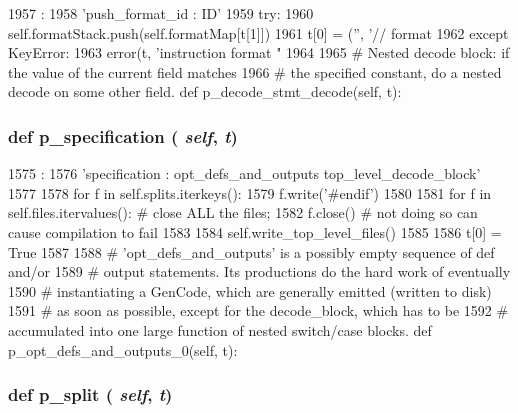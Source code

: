 \begin{DoxyCode}
1957                                  :
1958         'push_format_id : ID'
1959         try:
1960             self.formatStack.push(self.formatMap[t[1]])
1961             t[0] = ('', '// format %
1962         except KeyError:
1963             error(t, 'instruction format "%
1964 
1965     # Nested decode block: if the value of the current field matches
1966     # the specified constant, do a nested decode on some other field.
    def p_decode_stmt_decode(self, t):
\end{DoxyCode}
\hypertarget{classisa__parser_1_1ISAParser_ab00ad4dda9edefa214154bff3d217fc3}{
\subsubsection[{p\_\-specification}]{\setlength{\rightskip}{0pt plus 5cm}def p\_\-specification ( {\em self}, \/   {\em t})}}
\label{classisa__parser_1_1ISAParser_ab00ad4dda9edefa214154bff3d217fc3}



\begin{DoxyCode}
1575                                 :
1576         'specification : opt_defs_and_outputs top_level_decode_block'
1577 
1578         for f in self.splits.iterkeys():
1579             f.write('\n#endif\n')
1580 
1581         for f in self.files.itervalues(): # close ALL the files;
1582             f.close() # not doing so can cause compilation to fail
1583 
1584         self.write_top_level_files()
1585 
1586         t[0] = True
1587 
1588     # 'opt_defs_and_outputs' is a possibly empty sequence of def and/or
1589     # output statements. Its productions do the hard work of eventually
1590     # instantiating a GenCode, which are generally emitted (written to disk)
1591     # as soon as possible, except for the decode_block, which has to be
1592     # accumulated into one large function of nested switch/case blocks.
    def p_opt_defs_and_outputs_0(self, t):
\end{DoxyCode}
\hypertarget{classisa__parser_1_1ISAParser_aa8f605e6c66c7d30e22e84eeca9724a8}{
\subsubsection[{p\_\-split}]{\setlength{\rightskip}{0pt plus 5cm}def p\_\-split ( {\em self}, \/   {\em t})}}
\label{classisa__parser_1_1ISAParser_aa8f605e6c66c7d30e22e84eeca9724a8}



